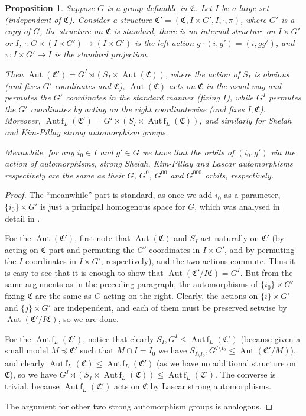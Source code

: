 \documentclass[final,a4paper,12pt]{amsart}
\newtheorem{prop}[thm]{Proposition}
\theoremstyle{remark}
\theoremstyle{definition}
\DeclareMathOperator{\Aut}{{Aut}}
\newcommand{\mon}{\mathfrak C}
\newcommand{\Autf}{\operatorname{Aut\,f}}
\begin{document}
	\begin{prop}
		Suppose $G$ is a group definable in $\mon$. Let $I$ be a large set (independent of $\mon$). Consider a structure $\mon'=(\mon,I\times G',I,\cdot,\pi)$, where $G'$ is a copy of $G$, the structure on $\mon$ is standard, there is no internal structure on $I\times G'$ or $I$, $\cdot\colon G\times (I\times G')\to (I\times G')$ is the left action $g\cdot(i,g')=(i,gg')$, and $\pi\colon I\times G'\to I$ is the standard projection.
		
		Then $\Aut(\mon')=G^I\rtimes(S_I\times \Aut(\mon))$, where the action of $S_I$ is obvious (and fixes $G'$ coordinates and $\mon$), $\Aut(\mon)$ acts on $\mon$ in the usual way and permutes the $G'$ coordinates in the standard manner (fixing $I$), while $G^I$ permutes the $G'$ coordinates by acting on the right coordinatewise (and fixes $I,\mon$). Moreover, $\Autf_L(\mon')=G^I\rtimes(S_I\times \Autf_L(\mon))$, and similarly for Shelah and Kim-Pillay strong automorphism groups.
		
		Meanwhile, for any $i_0\in I$ and $g'\in G$ we have that the orbits of $(i_0,g')$ via the action of automorphisms, strong Shelah, Kim-Pillay and Lascar automorphisms respectively are the same as their $G$, $G^0$, $G^{00}$ and $G^{000}$ orbits, respectively. 
	\end{prop}
	\begin{proof}
		The ``meanwhile'' part is standard, as once we add $i_0$ as a parameter, $\{i_0\}\times G'$ is just a principal homogenous space for $G$, which was analysed in detail in \cite{GN08}.
		
		For the $\Aut(\mon')$, first note that $\Aut(\mon)$ and $S_I$ act naturally on $\mon'$ (by acting on $\mon$ part and permuting the $G'$ coordinates in $I\times G'$, and by permuting the $I$ coordinates in $I\times G'$, respectively), and the two actions commute. Thus it is easy to see that it is enough to show that $\Aut(\mon'/I\mon)= G^I$. But from the same arguments as in the preceding paragraph, the automorphisms of $\{i_0\}\times G'$ fixing $\mon$ are the same as $G$ acting on the right. Clearly, the actions on $\{i\}\times G'$ and $\{j\}\times G'$ are independent, and each of them must be preserved setwise by $\Aut(\mon'/I\mon)$, so we are done.
		
		For the $\Autf_L(\mon')$, notice that clearly $S_I, G^I\leq \Autf_L(\mon')$ (because given a small model $M\preceq \mon'$ such that $M\cap I=I_0$ we have $S_{I\setminus I_0},G^{I\setminus I_0}\leq \Aut(\mon'/M)$), and clearly $\Autf_L(\mon)\leq \Autf_L(\mon')$ (as we have no additional structure on $\mon$), so we have $G^I\rtimes(S_I\times \Autf_L(\mon))\leq \Autf_L(\mon')$. The converse is trivial, because $\Autf_L(\mon')$ acts on $\mon$ by Lascar strong automorphisms.
		
		The argument for other two strong automorphism groups is analogous.
	\end{proof}
	
\end{document}
